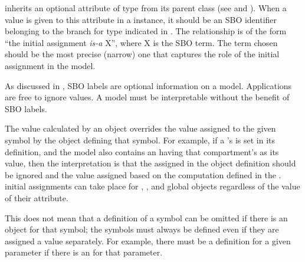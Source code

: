 \label{sec:initialassignment-sboterm}

\InitialAssignment inherits an optional 
attribute of type  from its parent
class \SBase (see 
and ).  When a value is given to this
attribute in a \InitialAssignment instance, it should be an
SBO identifier belonging to the branch for type \InitialAssignment  
indicated in .  The relationship is
of the form ``the initial assignment \emph{is-a} X'', where X is
the SBO term.  The term chosen should be the most precise (narrow)
one that captures the role of the initial assignment in the model.

As discussed in , SBO labels are optional
information on a model.  Applications are free to ignore
 values.  A model must be interpretable without the
benefit of SBO labels.


\label{sec:initial-assignment-semantics}

The value calculated by an \InitialAssignment object overrides the
value assigned to the given symbol by the object defining that
symbol.  For example, if a \Compartment's  is set in
its definition, and the model also contains an \InitialAssignment
having that compartment's  as its  value,
then the interpretation is that the  assigned in the
\Compartment object definition should be ignored and the value
assigned based on the computation defined in the
\InitialAssignment.   initial assignments can take place for
\Compartment, \Species, \SpeciesReference and global \Parameter
objects regardless of the value of their 
attribute.

This does not mean that a definition of a symbol can be omitted if
there is an \InitialAssignment object for that symbol; the symbols
must always be defined even if they are assigned a value
separately.  For example, there must be a \Parameter definition
for a given parameter if there is an \InitialAssignment for that
parameter.

